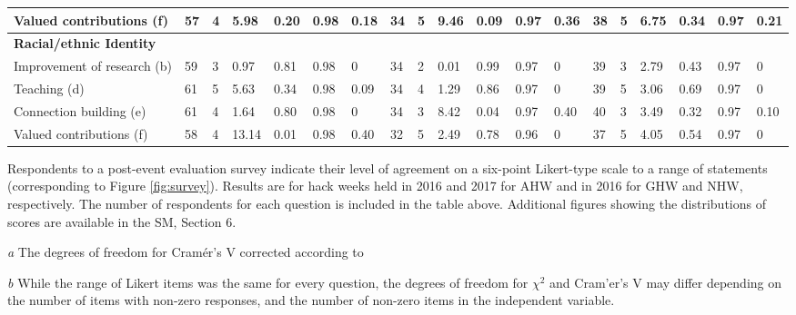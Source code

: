 \begin{table}
\begin{threeparttable}
\begin{tabularx}{18cm}{p{3.4cm}p{0.3cm}p{0.33cm}p{0.33cm}p{0.33cm}p{0.33cm}p{0.33cm}p{0.33cm}p{0.33cm}p{0.33cm}p{0.33cm}p{0.33cm}p{0.33cm}p{0.33cm}p{0.33cm}p{0.33cm}p{0.33cm}p{0.33cm}p{0.33cm}}
Valued contributions (f) & 57 & 4 & 5.98 & 0.20 & 0.98 & 0.18 & 34 & 5 & 9.46 & 0.09 & 0.97 & 0.36 & 38 & 5 & 6.75 & 0.34 & 0.97 & 0.21 \\ \midrule
\multicolumn{16}{l}{\textbf{Racial/ethnic Identity}} \\ \midrule
Improvement of research (b)  & 59 & 3 & 0.97 & 0.81 & 0.98 & 0 & 34 &2 & 0.01 & 0.99 & 0.97 & 0 & 39 & 3 & 2.79 & 0.43 & 0.97 & 0 \\
Teaching (d) & 61 & 5 & 5.63 & 0.34 & 0.98 & 0.09 & 34 & 4 & 1.29 & 0.86 & 0.97 & 0 & 39 & 5 & 3.06 & 0.69 & 0.97 & 0 \\
Connection building (e) & 61 & 4 & 1.64 & 0.80 & 0.98 & 0 & 34 & 3 & 8.42 & 0.04 & 0.97 & 0.40 & 40 & 3 & 3.49 & 0.32 & 0.97 & 0.10 \\
Valued contributions (f) & 58 & 4 & 13.14 & 0.01 & 0.98 & 0.40 & 32 & 5 & 2.49 & 0.78 & 0.96 & 0 & 37 & 5 & 4.05 & 0.54 & 0.97 & 0 \\ 
\bottomrule
\end{tabularx}
   \begin{tablenotes}
      \item{Respondents to a post-event evaluation survey indicate their level of agreement on a six-point Likert-type scale to a range of statements (corresponding to Figure \ref{fig:survey}). Results are for hack weeks held in 2016 and 2017 for AHW and in 2016 for GHW and NHW, respectively. The number of respondents for each question is included in the table above. Additional figures showing the distributions of scores are available in the SM, Section 6.}
      \item[\emph{a}]{The degrees of freedom for Cram\'{e}r's V corrected according to~\citep{bergsma2013}}
      \item[\emph{b}]{While the range of Likert items was the same for every question, the degrees of freedom for $\chi^2$ and Cram'{e}r's V may differ depending on the number of items with non-zero responses, and the number of non-zero items in the independent variable.}

\end{tablenotes}

\end{threeparttable}
\label{tab:survey}
\end{table}

